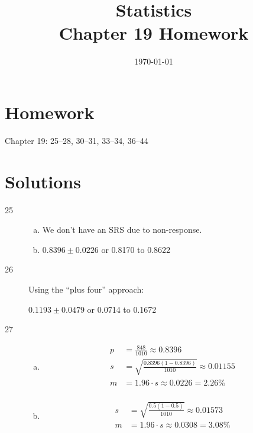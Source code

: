 \documentclass[letterpaper]{exam}
\title{Statistics \\ Chapter 19 Homework}
\date{\today}
\author{}
\begin{document}
  \maketitle

  \section{Homework}
  Chapter 19: 25--28, 30--31, 33--34, 36--44

  \ifprintanswers{}
    \section{Solutions}
    \begin{description}

      \item[25] 
        \begin{enumerate}[(a)]
          \item We don't have an SRS due to non-response.

          \item $0.8396 \pm 0.0226$ or 0.8170 to 0.8622
        \end{enumerate}

      \item[26] 
        Using the ``plus four'' approach: 

        $0.1193 \pm 0.0479$ or 0.0714 to 0.1672

      \item[27]
        \begin{enumerate}[(a)]
          \item 
            \begin{align*}
              p & = \frac{848}{1010} \approx 0.8396 \\
              s & = \sqrt{ \frac{0.8396 (1 - 0.8396)}{1010} } \approx 0.01155 \\
              m & = 1.96 \cdot s \approx 0.0226 = \boxed{ 2.26\% } \\
            \end{align*}

          \item 
            \begin{align*}
              s & = \sqrt{ \frac{0.5 (1 - 0.5)}{1010} } \approx 0.01573 \\
              m & = 1.96 \cdot s \approx 0.0308 = \boxed{ 3.08\% } \\
            \end{align*}


\end{enumerate}
\end{description}
\end{document}
